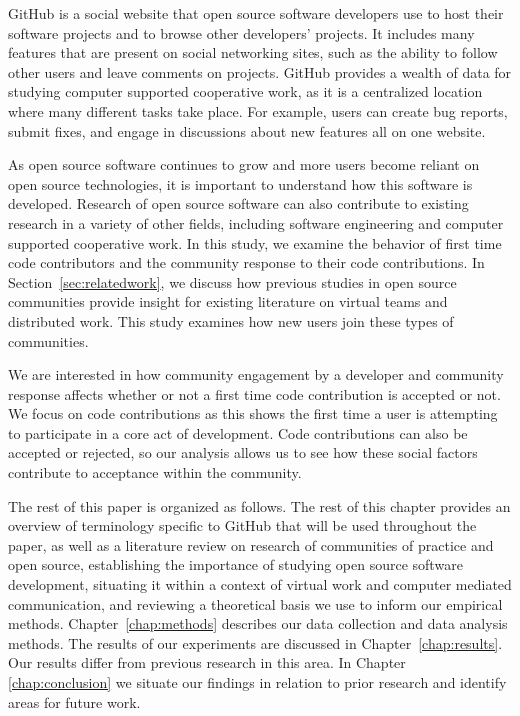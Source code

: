 \documentclass{iitthesis}
\begin{document}
\textpages     %


GitHub is a social website that open source software developers use to host
their software projects and to browse other developers' projects. It includes
many features that are present on social networking sites, such as the ability
to follow other users and leave comments on projects. GitHub provides a wealth
of data for studying computer supported cooperative work, as it is a
centralized location where many different tasks take place. For example, users
can create bug reports, submit fixes, and engage in discussions about new
features all on one website.

As open source software continues to grow and more users become reliant on open
source technologies, it is important to understand how this software is
developed. Research of open source software can also contribute to existing
research in a variety of other fields, including software engineering and computer
supported cooperative work. In this study, we examine the behavior of first time
code contributors and the community response to their code contributions. In
Section~\ref{sec:relatedwork}, we discuss how previous studies in open source
communities provide insight for existing literature on virtual teams and
distributed work. This study examines how new users join these types of
communities.

We are interested in how community engagement by a developer and community
response affects whether or not a first time code contribution is accepted or
not. We focus on code contributions as this shows the first time a user is
attempting to participate in a core act of development. Code contributions can
also be accepted or rejected, so our analysis allows us to see how these
social factors contribute to acceptance within the community.

The rest of this paper is organized as follows. The rest of this chapter
provides an overview of terminology specific to GitHub that will be used
throughout the paper, as well as  a literature review on research of communities
of practice and open source, establishing the importance of studying open source
software development, situating it within a context of virtual work and computer
mediated communication, and reviewing a theoretical basis we use to inform our
empirical methods. Chapter~\ref{chap:methods} describes our data collection and
data analysis methods. The results of our experiments are discussed in
Chapter~\ref{chap:results}. Our results differ from previous research in this
area. In Chapter \ref{chap:conclusion} we situate our findings in relation to
prior research and identify areas for future work.
\end{document}
